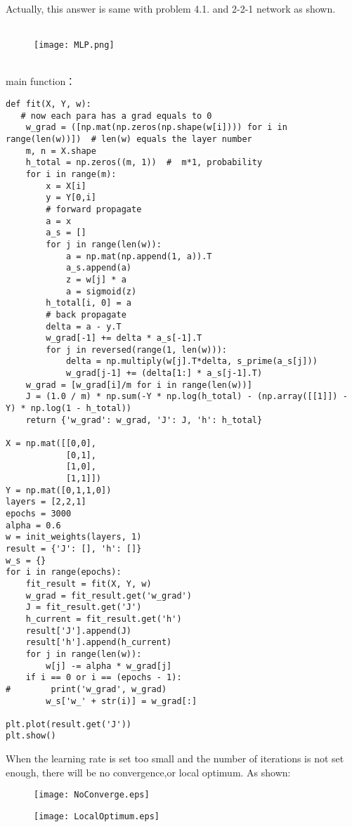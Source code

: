 \noindent Actually, this answer is same with problem 4.1. and 2-2-1 network as shown.
~\\
~\\

\begin{figure}[!h]
  \centering
  \texttt{[image: MLP.png]}
\end{figure}
~\\

\noindent main function：
\begin{lstlisting}
def fit(X, Y, w):
   # now each para has a grad equals to 0
    w_grad = ([np.mat(np.zeros(np.shape(w[i]))) for i in range(len(w))])  # len(w) equals the layer number
    m, n = X.shape
    h_total = np.zeros((m, 1))  #  m*1, probability
    for i in range(m):
        x = X[i]
        y = Y[0,i]
        # forward propagate
        a = x
        a_s = []
        for j in range(len(w)):
            a = np.mat(np.append(1, a)).T
            a_s.append(a)
            z = w[j] * a
            a = sigmoid(z)
        h_total[i, 0] = a
        # back propagate
        delta = a - y.T
        w_grad[-1] += delta * a_s[-1].T
        for j in reversed(range(1, len(w))):
            delta = np.multiply(w[j].T*delta, s_prime(a_s[j]))
            w_grad[j-1] += (delta[1:] * a_s[j-1].T)
    w_grad = [w_grad[i]/m for i in range(len(w))]
    J = (1.0 / m) * np.sum(-Y * np.log(h_total) - (np.array([[1]]) - Y) * np.log(1 - h_total))
    return {'w_grad': w_grad, 'J': J, 'h': h_total}

X = np.mat([[0,0],
            [0,1],
            [1,0],
            [1,1]])
Y = np.mat([0,1,1,0])
layers = [2,2,1]
epochs = 3000
alpha = 0.6
w = init_weights(layers, 1)
result = {'J': [], 'h': []}
w_s = {}
for i in range(epochs):
    fit_result = fit(X, Y, w)
    w_grad = fit_result.get('w_grad')
    J = fit_result.get('J')
    h_current = fit_result.get('h')
    result['J'].append(J)
    result['h'].append(h_current)
    for j in range(len(w)):
        w[j] -= alpha * w_grad[j]
    if i == 0 or i == (epochs - 1):
#        print('w_grad', w_grad)
        w_s['w_' + str(i)] = w_grad[:]

plt.plot(result.get('J'))
plt.show()
\end{lstlisting}

\newpage
\noindent When the learning rate is set too small and the number of iterations is not set enough, there will be no convergence,or local optimum. As shown:

\begin{figure}[!h]
\begin{minipage}
{0.5\linewidth}
\centering
\texttt{[image: NoConverge.eps]}
\end{minipage}
%
\begin{minipage}
{0.5\linewidth}
\centering
\texttt{[image: LocalOptimum.eps]}
\end{minipage}
\end{figure}

